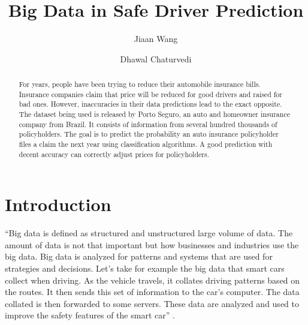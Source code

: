 \title{Big Data in Safe Driver Prediction}

\author{Jiaan Wang}

\author{Dhawal Chaturvedi}

\begin{abstract}

    For years, people have been trying to reduce their automobile
    insurance bills. Insurance companies claim that price will be
    reduced for good drivers and raised for bad ones. However,
    inaccuracies in their data predictions lead to the exact
    opposite. The dataset being used is released by Porto Seguro,
    an auto and homeowner insurance company from Brazil. It
    consists of information from several hundred thousands of
    policyholders. The goal is to predict the probability an auto
    insurance policyholder files a claim the next year using
    classification algorithms. A good prediction with decent
    accuracy can correctly adjust prices for policyholders.
    
\end{abstract}


\maketitle

\section{Introduction}

``Big data is defined as structured and unstructured large volume of data. The amount of data is not that important but how businesses and industries use the big data. Big data is analyzed for patterns and systems that are used for strategies and decisions. Let’s take for example the big data that smart cars collect when driving. As the vehicle travels, it collates driving patterns based on the routes. It then sends this set of information to the car’s computer. The data collated is then forwarded to some servers. These data are analyzed and used to improve the safety features of the smart car'' \cite{Walker2017safety}.

